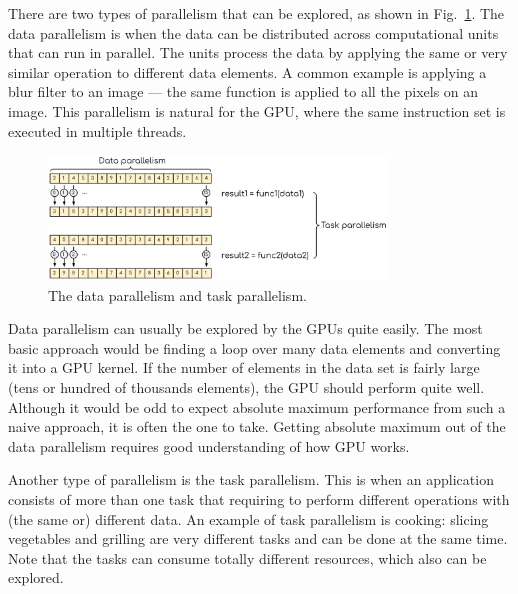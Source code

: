 \par
There are two types of parallelism that can be explored, as shown in Fig.~\ref{fig:data_task_parallelism}.
The data parallelism is when the data can be distributed across computational units that can run in parallel.
The units process the data by applying the same or very similar operation to different data elements.
A common example is applying a blur filter to an image --- the same function is applied to all the pixels on an image.
This parallelism is natural for the GPU, where the same instruction set is executed in multiple threads.


\begin{figure}[!h]
\centering\includegraphics[width=0.8\textwidth]{fig_hardware/data_task_parallelism.png}
\caption{The data parallelism and task parallelism.}\label{fig:data_task_parallelism}
\end{figure}


\par
Data parallelism can usually be explored by the GPUs quite easily.
The most basic approach would be finding a loop over many data elements and converting it into a GPU kernel.
If the number of elements in the data set is fairly large (tens or hundred of thousands elements), the GPU should perform quite well.
Although it would be odd to expect absolute maximum performance from such a naive approach, it is often the one to take.
Getting absolute maximum out of the data parallelism requires good understanding of how GPU works.

\par
Another type of parallelism is the task parallelism.
This is when an application consists of more than one task that requiring to perform different operations with (the same or) different data.
An example of task parallelism is cooking: slicing vegetables and grilling are very different tasks and can be done at the same time.
Note that the tasks can consume totally different resources, which also can be explored.


